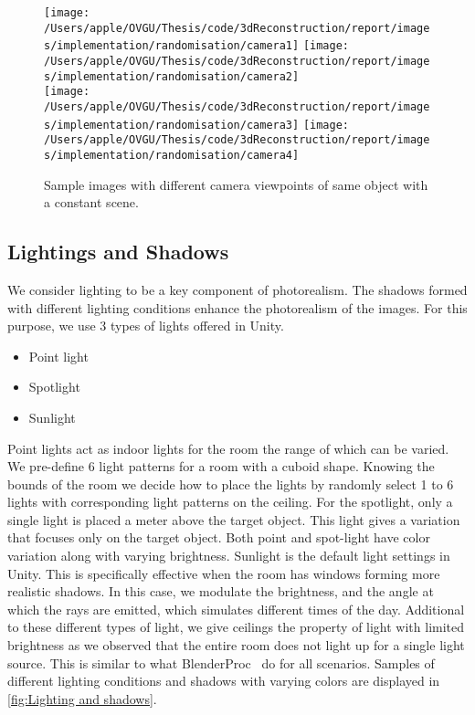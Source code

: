 \begin{figure}
    \centering
    \texttt{[image: /Users/apple/OVGU/Thesis/code/3dReconstruction/report/images/implementation/randomisation/camera1]}
    \texttt{[image: /Users/apple/OVGU/Thesis/code/3dReconstruction/report/images/implementation/randomisation/camera2]}\\
    \vspace{0.1cm}
    \texttt{[image: /Users/apple/OVGU/Thesis/code/3dReconstruction/report/images/implementation/randomisation/camera3]}
    \texttt{[image: /Users/apple/OVGU/Thesis/code/3dReconstruction/report/images/implementation/randomisation/camera4]}\\
    \caption{Sample images with different camera viewpoints of same object with a constant scene.}
    \label{fig:Camera viewpoints}
\end{figure}

\subsection{Lightings and Shadows}\label{subsec:lightings-and-shadows}

We consider lighting to be a key component of photorealism.
The shadows formed with different lighting conditions enhance the photorealism of the images.
For this purpose, we use 3 types of lights offered in Unity.

\begin{itemize}
    \item Point light
    \item Spotlight
    \item Sunlight
\end{itemize}

Point lights act as indoor lights for the room the range of which can be varied.
We pre-define 6 light patterns for a room with a cuboid shape.
Knowing the bounds of the room we decide how to place the lights by randomly select 1 to 6 lights with corresponding light patterns on the ceiling.
For the spotlight, only a single light is placed a meter above the target object.
This light gives a variation that focuses only on the target object.
Both point and spot-light have color variation along with varying brightness.
Sunlight is the default light settings in Unity.
This is specifically effective when the room has windows forming more realistic shadows.
In this case, we modulate the brightness, and the angle at which the rays are emitted, which simulates different times of the day.
Additional to these different types of light, we give ceilings the property of light with limited brightness as we observed that the entire room does not light up for a single light source.
This is similar to what BlenderProc~\cite{denninger2019blenderproc} do for all scenarios.
Samples of different lighting conditions and shadows with varying colors are displayed in \autoref{fig:Lighting and shadows}.

